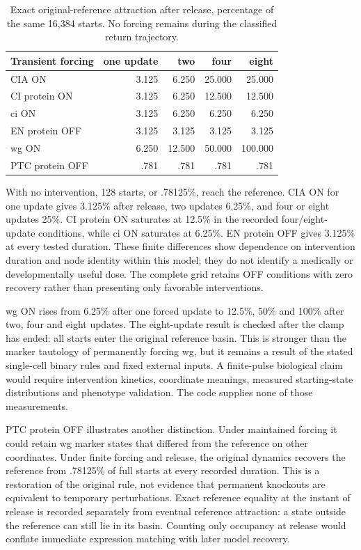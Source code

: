 \begin{table}[ht]\centering\small
\caption{Exact original-reference attraction after release, percentage of the same 16,384 starts. No forcing remains during the classified return trajectory.}
\begin{tabular}{lrrrr}\toprule
Transient forcing & one update & two & four & eight\\\midrule
CIA ON & 3.125 & 6.250 & 25.000 & 25.000\\
CI protein ON & 3.125 & 6.250 & 12.500 & 12.500\\
ci ON & 3.125 & 6.250 & 6.250 & 6.250\\
EN protein OFF & 3.125 & 3.125 & 3.125 & 3.125\\
wg ON & 6.250 & 12.500 & 50.000 & 100.000\\
PTC protein OFF & .781 & .781 & .781 & .781\\\bottomrule
\end{tabular}\end{table}

With no intervention, 128 starts, or .78125\%, reach the reference. CIA ON for one update gives 3.125\% after release, two updates 6.25\%, and four or eight updates 25\%. CI protein ON saturates at 12.5\% in the recorded four/eight-update conditions, while ci ON saturates at 6.25\%. EN protein OFF gives 3.125\% at every tested duration. These finite differences show dependence on intervention duration and node identity within this model; they do not identify a medically or developmentally useful dose. The complete grid retains OFF conditions with zero recovery rather than presenting only favorable interventions.

wg ON rises from 6.25\% after one forced update to 12.5\%, 50\% and 100\% after two, four and eight updates. The eight-update result is checked after the clamp has ended: all starts enter the original reference basin. This is stronger than the marker tautology of permanently forcing wg, but it remains a result of the stated single-cell binary rules and fixed external inputs. A finite-pulse biological claim would require intervention kinetics, coordinate meanings, measured starting-state distributions and phenotype validation. The code supplies none of those measurements.

PTC protein OFF illustrates another distinction. Under maintained forcing it could retain wg marker states that differed from the reference on other coordinates. Under finite forcing and release, the original dynamics recovers the reference from .78125\% of full starts at every recorded duration. This is a restoration of the original rule, not evidence that permanent knockouts are equivalent to temporary perturbations. Exact reference equality at the instant of release is recorded separately from eventual reference attraction: a state outside the reference can still lie in its basin. Counting only occupancy at release would conflate immediate expression matching with later model recovery.

